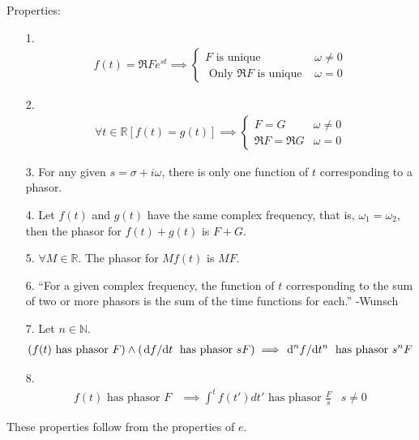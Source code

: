 \documentclass[12pt, english]{book}
\begin{document}
	Properties:  
	\begin{itemize}
		\item[1.] 
		\begin{align*}
			f(t) = \Re{Fe^{st}} \implies 
			\begin{cases}
				F \text{ is unique } & \omega \neq 0 \\
				\text{ Only } \Re{F} \text{ is unique } & \omega = 0
			\end{cases}
		\end{align*}
		\item[2.] 
		\begin{align*}
			\forall t\in \mathbb{R} [f(t) = g(t)] \implies 
			\begin{cases}
				F = G & \omega \neq 0 \\
				\Re{F} = \Re{G} & \omega = 0
			\end{cases}
		\end{align*}
		\item[3.] For any given \(s = \sigma + i \omega \), there is only one function of \(t\) corresponding to a phasor.
		\item[4.] Let \(f(t)\) and \(g(t)\) have the same complex frequency, that is, \(\omega_1 = \omega_2\), then the phasor for \(f(t) + g(t)\) is \(F + G\).
		\item[5.] \(\forall M \in \mathbb{R}\). The phasor for \(Mf(t)\) is \(MF\).
		\item[6.] ``For a given complex frequency, the function of \(t\) corresponding to the sum of two or more phasors is the sum of the time functions for each.'' -Wunsch
		\item[7.] Let \(n \in \mathbb{N}\).
		\begin{align*}
			(f(t) \text{ has phasor } F) \land (\dv*{f}{t} \text{ has phasor } sF) \implies \dv*[n]{f}{t} \text{ has phasor } s^n F
		\end{align*}
		\item[8.] 
		\begin{align*}
			f(t) \text{ has phasor } F &\implies \int^t f(t') dt'  \text{ has phasor } \frac{F}{s} & s\neq 0
		\end{align*}
	\end{itemize}
	These properties follow from the properties of \(e\).
	
\end{document}
